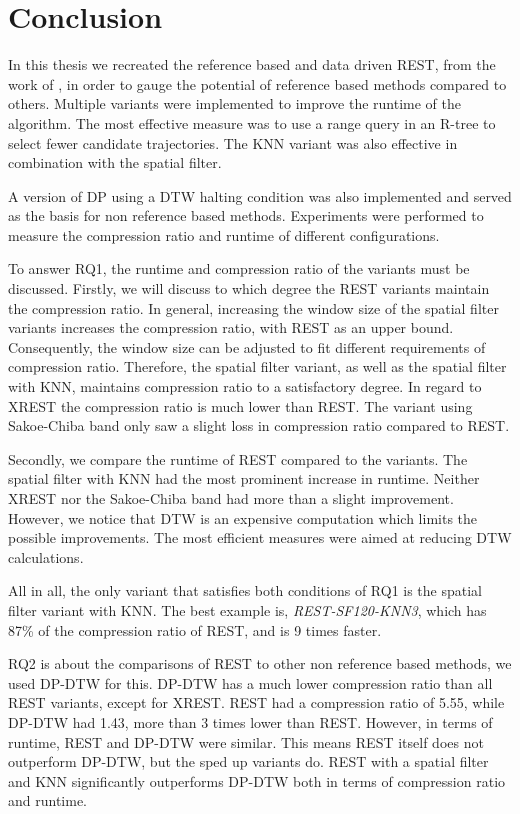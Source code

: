 \chapter{Conclusion}\label{chap:conclusion}
In this thesis we recreated the reference based and data driven REST, from the work of \textcite{zhao2018rest}, in order to gauge the potential of reference based methods compared to others. Multiple variants were implemented to improve the runtime of the algorithm. The most effective measure was to use a range query in an R-tree to select fewer candidate trajectories. The KNN variant was also effective in combination with the spatial filter.

A version of DP using a DTW halting condition was also implemented and served as the basis for non reference based methods. Experiments were performed to measure the compression ratio and runtime of different configurations.

To answer RQ1, the runtime and compression ratio of the variants must be discussed. Firstly, we will discuss to which degree the REST variants maintain the compression ratio. In general, increasing the window size of the spatial filter variants increases the compression ratio, with REST as an upper bound. Consequently, the window size can be adjusted to fit different requirements of compression ratio. Therefore, the spatial filter variant, as well as the spatial filter with KNN, maintains compression ratio to a satisfactory degree. In regard to XREST the compression ratio is much lower than REST. The variant using Sakoe-Chiba band only saw a slight loss in compression ratio compared to REST.

Secondly, we compare the runtime of REST compared to the variants. The spatial filter with KNN had the most prominent increase in runtime. Neither XREST nor the Sakoe-Chiba band had more than a slight improvement. However, we notice that DTW is an expensive computation which limits the possible improvements. The most efficient measures were aimed at reducing DTW calculations.

All in all, the only variant that satisfies both conditions of RQ1 is the spatial filter variant with KNN. The best example is, \textit{REST-SF120-KNN3}, which has 87\% of the compression ratio of REST, and is 9 times faster.

RQ2 is about the comparisons of REST to other non reference based methods, we used DP-DTW for this. DP-DTW has a much lower compression ratio than all REST variants, except for XREST. REST had a compression ratio of 5.55, while DP-DTW had 1.43, more than 3 times lower than REST. However, in terms of runtime, REST and DP-DTW were similar. This means REST itself does not outperform DP-DTW, but the sped up variants do. REST with a spatial filter and KNN significantly outperforms DP-DTW both in terms of compression ratio and runtime.

